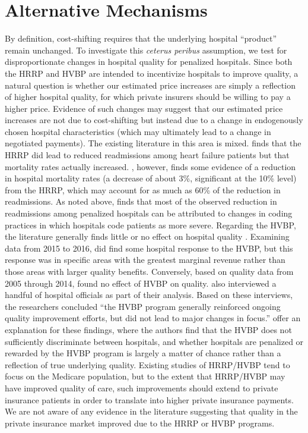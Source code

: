 \documentclass[12pt]{article}
\begin{document}
\section{Alternative Mechanisms}
\label{sec:alt}
By definition, cost-shifting requires that the underlying hospital ``product'' remain unchanged. To investigate this \textit{ceterus peribus} assumption, we test for disproportionate changes in hospital quality for penalized hospitals.  Since both the HRRP and HVBP are intended to incentivize hospitals to improve quality, a natural question is whether our estimated price increases are simply a reflection of higher hospital quality, for which private insurers should be willing to pay a higher price.  Evidence of such changes may suggest that our estimated price increases are not due to cost-shifting but instead due to a change in endogenously chosen hospital characteristics (which may ultimately lead to a change in negotiated payments).  The existing literature in this area is mixed. \cite{gupta2017} finds that the HRRP did lead to reduced readmissions among heart failure patients but that mortality rates actually increased. \cite{gupta2016}, however, finds some evidence of a reduction in hospital mortality rates (a decrease of about 3\%, significant at the 10\% level) from the HRRP, which may account for as much as 60\% of the reduction in readmissions.  As noted above, \citet{Ibrahim2017} finds that most of the observed reduction in readmissions among penalized hospitals can be attributed to changes in coding practices in which hospitals code patients as more severe.  Regarding the HVBP, the literature generally finds little or no effect on hospital quality \citep{ryan2015,doran2017,norton2017,ryan2017}. Examining data from 2015 to 2016, \cite{norton2017} did find some hospital response to the HVBP, but this response was in specific areas with the greatest marginal revenue rather than those areas with larger quality benefits. Conversely, based on quality data from 2005 through 2014, \cite{gao2015} found no effect of HVBP on quality. \cite{gao2015} also interviewed a handful of hospital officials as part of their analysis. Based on these interviews, the researchers concluded ``the HVBP program generally reinforced ongoing quality improvement efforts, but did not lead to major changes in focus.'' \cite{friedson2016} offer an explanation for these findings, where the authors find that the HVBP does not sufficiently discriminate between hospitals, and whether hospitals are penalized or rewarded by the HVBP program is largely a matter of chance rather than a reflection of true underlying quality.  Existing studies of HRRP/HVBP tend to focus on the Medicare population, but to the extent that HRRP/HVBP may have improved quality of care, such improvements should extend to private insurance patients in order to translate into higher private insurance payments. We are not aware of any evidence in the literature suggesting that quality in the private insurance market improved due to the HRRP or HVBP programs.
\end{document}
